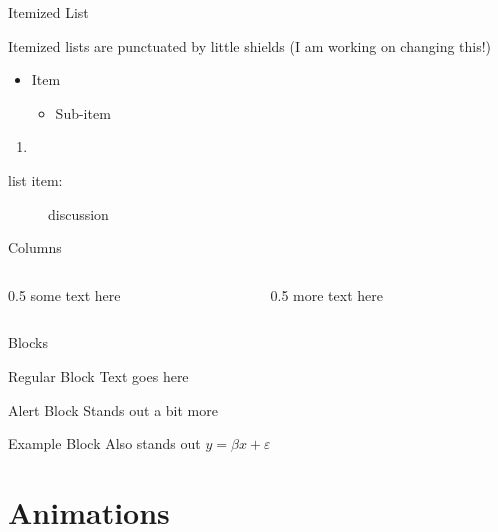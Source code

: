 \documentclass[12pt, aspectratio = 169]{beamer}
\begin{document}
\begin{frame}{Itemized List}

	Itemized lists are punctuated by little shields (I am working on changing this!)
	\begin{itemize}
		\item Item
			\begin{itemize}
				\item Sub-item
			\end{itemize}
	\end{itemize}
	\begin{enumerate}%
	\item
	\end{enumerate}
	\begin{description}
	\item[list item:] discussion
	\end{description}
\end{frame}
\begin{frame}{Columns}
\begin{columns}
	\begin{column}{0.5\textwidth}
   		some text here
	\end{column}
	\begin{column}{0.5\textwidth}
   		more text here
	\end{column}
\end{columns}
\end{frame}

\begin{frame}{Blocks}

	\begin{block}{Regular Block}
		Text goes here
	\end{block}

	\begin{alertblock}{Alert Block}
		Stands out a bit more
	\end{alertblock}

	\begin{exampleblock}{Example Block}
		Also stands out $y=\beta x+ \varepsilon$
	\end{exampleblock}

\end{frame}

\section{Animations}
\end{document}
